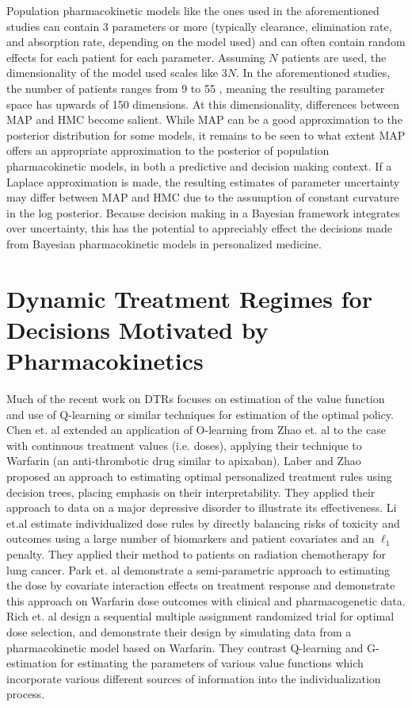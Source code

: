Population pharmacokinetic models like the ones used in the aforementioned studies can contain 3 parameters or more (typically clearance, elimination rate, and absorption rate, depending on the model used) and can often contain random effects for each patient for each parameter.  Assuming $N$ patients are used, the dimensionality of the model used scales like $3N$.  In the aforementioned studies, the number of patients ranges from 9 \cite{gibert2022development}to 55 \cite{sturkenboom2015pharmacokinetic}, meaning the resulting parameter space has upwards of 150 dimensions.  At this dimensionality, differences between MAP and HMC become salient. While MAP can be a good approximation to the posterior distribution for some models, it remains to be seen to what extent MAP offers an appropriate approximation to the posterior of population pharmacokinetic models, in both a predictive and decision making context.  If a Laplace approximation is made, the resulting estimates of parameter uncertainty may differ between MAP and HMC due to the assumption of constant curvature in the log posterior.  Because decision making in a Bayesian framework integrates over uncertainty, this has the potential to appreciably effect the decisions made from Bayesian pharmacokinetic models in personalized medicine.

\section{Dynamic Treatment Regimes for Decisions Motivated by Pharmacokinetics}

Much of the recent work on DTRs focuses on estimation of the value function and use of Q-learning or similar techniques for estimation of the optimal policy. Chen et. al \cite{chen2016personalized} extended an application of O-learning from Zhao et. al \cite{zhao2012estimating} to the case with continuous treatment values (i.e. doses), applying their technique to Warfarin (an anti-thrombotic drug similar to apixaban).  Laber and Zhao \cite{laber2015tree} proposed an approach to estimating optimal personalized treatment rules using decision trees, placing emphasis on their interpretability.  They applied their approach to data on a major depressive disorder to illustrate its effectiveness. Li et.al \cite{li2020utility} estimate individualized dose rules by directly balancing risks of toxicity and outcomes using a large number of biomarkers and patient covariates and an $\ell_1$ penalty.  They applied their method to patients on radiation chemotherapy for lung cancer. Park et. al \cite{park2021single} demonstrate a semi-parametric approach to estimating the dose by covariate interaction effects on treatment response and demonstrate this approach on Warfarin dose outcomes with clinical and pharmacogenetic data.  Rich et. al \cite{rich2014simulating} design a sequential multiple assignment randomized trial for optimal dose selection, and demonstrate their design by simulating data from a pharmacokinetic model based on Warfarin. They contrast Q-learning and G-estimation for estimating the parameters of various value functions which incorporate various different sources of information into the individualization process. 

